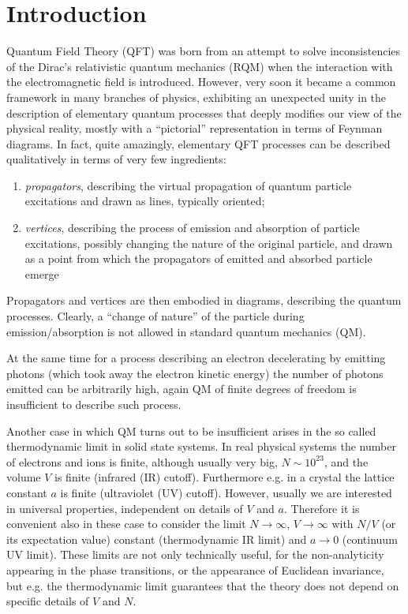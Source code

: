 \documentclass[../main/main.tex]{subfiles}
\begin{document}

\chapter{Introduction} 

Quantum Field Theory (QFT) was born from an attempt to solve inconsistencies of the Dirac's relativistic quantum mechanics (RQM) when the interaction with the electromagnetic field is introduced. However, very soon it became a common framework in many branches of physics, exhibiting an unexpected unity in the description of elementary quantum processes that deeply modifies our view of the physical reality, mostly with a ``pictorial'' representation in terms of Feynman diagrams. In fact, quite amazingly, elementary QFT processes can be described qualitatively in terms of  very few ingredients:
\begin{enumerate}[label=\textbullet]
	\item \emph{propagators}, describing the virtual propagation of quantum particle excitations and drawn as lines, typically oriented;
	\item \emph{vertices}, describing the process of emission and absorption of particle excitations, possibly changing the nature of the original particle, and drawn as a point from which the propagators of emitted and absorbed particle emerge
\end{enumerate}
Propagators and vertices are then embodied in diagrams, describing the quantum processes. Clearly, a ``change of nature'' of the particle during emission/absorption is not allowed in standard quantum mechanics (QM). 

At the same time for a process describing an electron decelerating by emitting photons (which took away the electron kinetic energy) the number of photons emitted can be arbitrarily high, again QM of finite degrees of freedom is insufficient to describe such process. 

Another case in which QM turns out to be insufficient arises in the so called thermodynamic limit in solid state systems. In real physical systems the number of electrons and ions is finite, although usually very big, $N\sim10^{23}$, and the volume $V$ is finite (infrared (IR) cutoff). Furthermore e.g. in a crystal the lattice constant $a$ is finite (ultraviolet (UV) cutoff). However, usually we are interested in universal properties, independent on details of $V$ and $a$. Therefore it is convenient also in these case to consider the limit $N\to\infty$, $V\to\infty$ with $N/V$ (or its expectation value) constant (thermodynamic IR limit) and $a\to0$ (continuum UV limit). These limits are not only technically useful, for the non-analyticity appearing in the phase transitions, or the appearance of Euclidean invariance, but e.g. the thermodynamic limit guarantees that the theory does not depend on specific details of $V$ and $N$. 
\end{document}
